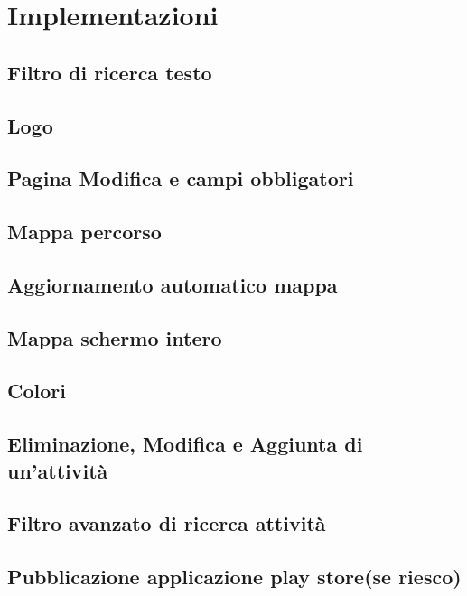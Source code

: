 \section{Implementazioni}

\subsection{Filtro di ricerca testo}

\subsection{Logo}

\subsection{Pagina Modifica e campi obbligatori}

\subsection{Mappa percorso}

\subsection{Aggiornamento automatico mappa}

\subsection{Mappa schermo intero}

\subsection{Colori}

\subsection{Eliminazione, Modifica e Aggiunta di un'attività}

\subsection{Filtro avanzato di ricerca attività}

\subsection{Pubblicazione applicazione play store(se riesco)}


